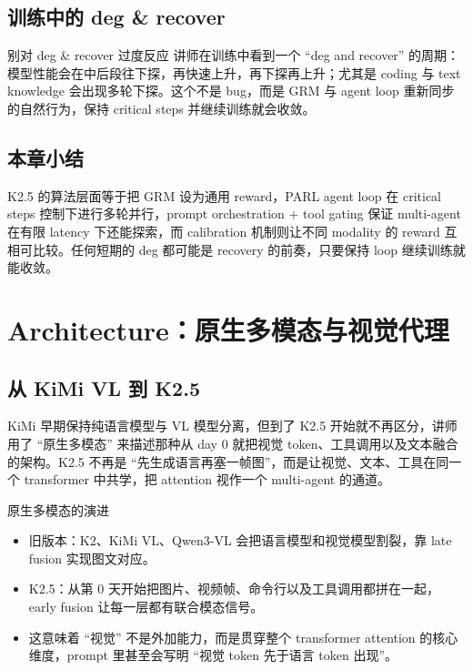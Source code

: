 \documentclass[a4paper]{article}
\begin{document}
\subsection{训练中的 deg \& recover}
\begin{warningbox}{别对 deg \& recover 过度反应}
讲师在训练中看到一个 ``deg and recover'' 的周期：模型性能会在中后段往下探，再快速上升，再下探再上升；尤其是 coding 与 text knowledge 会出现多轮下探。这个不是 bug，而是 GRM 与 agent loop 重新同步的自然行为，保持 critical steps 并继续训练就会收敛。
\end{warningbox}

\subsection{本章小结}
K2.5 的算法层面等于把 GRM 设为通用 reward，PARL agent loop 在 critical steps 控制下进行多轮并行，prompt orchestration + tool gating 保证 multi-agent 在有限 latency 下还能探索，而 calibration 机制则让不同 modality 的 reward 互相可比较。任何短期的 deg 都可能是 recovery 的前奏，只要保持 loop 继续训练就能收敛。
\section{Architecture：原生多模态与视觉代理}

\subsection{从 KiMi VL 到 K2.5}
KiMi 早期保持纯语言模型与 VL 模型分离，但到了 K2.5 开始就不再区分，讲师用了 ``原生多模态'' 来描述那种从 day 0 就把视觉 token、工具调用以及文本融合的架构。K2.5 不再是 ``先生成语言再塞一帧图''，而是让视觉、文本、工具在同一个 transformer 中共学，把 attention 视作一个 multi-agent 的通道。

\begin{importantbox}{原生多模态的演进}
\begin{itemize}
    \item 旧版本：K2、KiMi VL、Qwen3-VL 会把语言模型和视觉模型割裂，靠 late fusion 实现图文对应。
    \item K2.5：从第 0 天开始把图片、视频帧、命令行以及工具调用都拼在一起，early fusion 让每一层都有联合模态信号。
    \item 这意味着 ``视觉'' 不是外加能力，而是贯穿整个 transformer attention 的核心维度，prompt 里甚至会写明 ``视觉 token 先于语言 token 出现''。
\end{itemize}
\end{importantbox}
\end{document}
